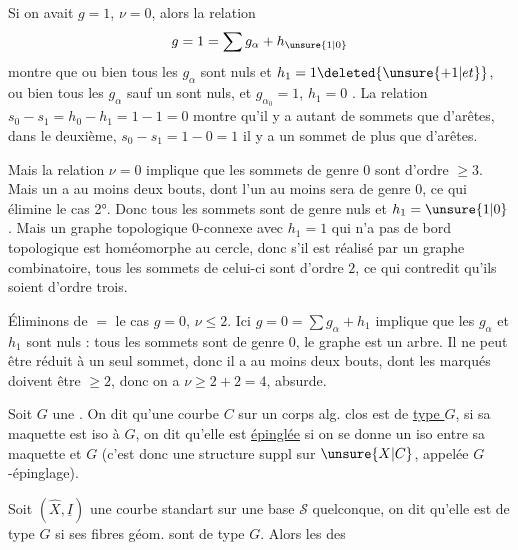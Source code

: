 Si on avait $g=1$, $\nu=0$, alors la relation
\[
g=1=\sum g_\alpha+h_{\unsure{1|0}}
\]
montre que ou bien tous les $g_\alpha$ sont nuls et $h_1=1\deleted{\unsure{+1|et}}$, ou bien tous les $g_\alpha$ sauf un  sont nuls, et $g_{\alpha_0}=1$, $h_1=0$ .  La relation $s_0-s_1=h_0-h_1=1-1=0$ montre qu'il y a autant de sommets que d'arêtes, dans le deuxième, $s_0-s_1=1-0=1$ il y a un sommet de plus que d'arêtes.

Mais la relation $\nu=0$ implique que les sommets de genre $0$ sont d'ordre $\geq3$.  Mais un   a au moins deux bouts, dont l'un au moins sera de genre $0$, ce qui élimine le cas 2°. Donc tous les sommets sont de genre nuls  et $h_1=\unsure{1|0}$. Mais  un graphe topologique $0$-connexe avec $h_1=1$ qui n'a pas de  bord topologique est homéomorphe au cercle, donc s'il est réalisé par un graphe combinatoire, tous les sommets de celui-ci sont d'ordre $2$, ce qui contredit qu'ils soient d'ordre trois.

Éliminons de $=$ le cas $g=0$, $\nu\leq2$. Ici $g=0=\sum g_\alpha+h_1$ implique que les $g_\alpha$ et $h_1$ sont nuls : tous les sommets sont de genre $0$, le graphe est un arbre. Il ne peut être réduit à un seul sommet, donc il a au moins deux bouts, dont les  marqués doivent être $\geq2$, donc  on a $\nu\geq2+2=4$, absurde.

Soit $G$ une . On dit qu'une  courbe  $C$ sur un corps alg. clos est de \uline{type $G$}, si sa maquette est iso à $G$, on dit qu'elle est \uline{épinglée} si on se donne un iso entre sa maquette et $G$ (c'est donc une structure suppl sur $\unsure{X|C}$, appelée $G$-épinglage).

Soit $(\widehat X,\underline I)$ une courbe standart sur une base $\mathcal S$ quelconque, on dit qu'elle est de type $G$ si ses fibres géom. sont de type $G$. Alors les  des

